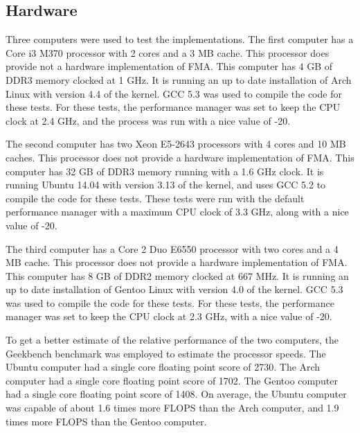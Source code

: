 \documentclass{cccg16}
\begin{document}
\subsection{Hardware}
Three computers were used to test the implementations.  The first
computer has a Core i3 M370 processor with 2 cores and a 3 MB cache.
This processor does provide not a hardware implementation of FMA.
This computer has 4 GB of DDR3 memory clocked at 1 GHz.  It is running
an up to date installation of Arch Linux with version 4.4 of the
kernel.  GCC 5.3 was used to compile the code for these tests.  For
these tests, the performance manager was set to keep the CPU clock at
2.4 GHz, and the process was run with a nice value of -20.

The second computer has two Xeon E5-2643 processors with 4 cores and
10 MB caches.  This processor does not provide a hardware
implementation of FMA.  This computer has 32 GB of DDR3 memory running
with a 1.6 GHz clock.  It is running Ubuntu 14.04 with version 3.13 of
the kernel, and uses GCC 5.2 to compile the code for these tests.
These tests were run with the default performance manager with a
maximum CPU clock of 3.3 GHz, along with a nice value of -20.

The third computer has a Core 2 Duo E6550 processor with two cores and
a 4 MB cache.  This processor does not provide a hardware
implementation of FMA.  This computer has 8 GB of DDR2 memory clocked
at 667 MHz.  It is running an up to date installation of Gentoo Linux
with version 4.0 of the kernel.  GCC 5.3 was used to compile the code
for these tests.  For these tests, the performance manager was set to
keep the CPU clock at 2.3 GHz, with a nice value of -20.

To get a better estimate of the relative performance of the two
computers, the Geekbench benchmark was employed to estimate the
processor speeds.  The Ubuntu computer had a single core floating
point score of 2730.  The Arch computer had a single core floating
point score of 1702.  The Gentoo computer had a single core floating
point score of 1408.  On average, the Ubuntu computer was capable of
about 1.6 times more FLOPS than the Arch computer, and 1.9 times more
FLOPS than the Gentoo computer.
\end{document}
